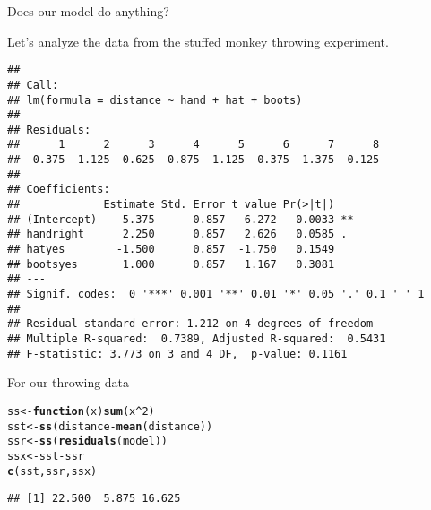 \documentclass[10pt]{beamer}\usepackage[]{graphicx}\usepackage[]{color}
\makeatletter
\newcommand{\hlnum}[1]{\textcolor[rgb]{0.686,0.059,0.569}{#1}}%
\newcommand{\hlopt}[1]{\textcolor[rgb]{0,0,0}{#1}}%
\newcommand{\hlstd}[1]{\textcolor[rgb]{0.345,0.345,0.345}{#1}}%
\newcommand{\hlkwa}[1]{\textcolor[rgb]{0.161,0.373,0.58}{\textbf{#1}}}%
\newcommand{\hlkwb}[1]{\textcolor[rgb]{0.69,0.353,0.396}{#1}}%
\newcommand{\hlkwc}[1]{\textcolor[rgb]{0.333,0.667,0.333}{#1}}%
\newcommand{\hlkwd}[1]{\textcolor[rgb]{0.737,0.353,0.396}{\textbf{#1}}}%
\newenvironment{kframe}{%
 \def\at@end@of@kframe{}%
 \ifinner\ifhmode%
  \def\at@end@of@kframe{\end{minipage}}%
  \begin{minipage}{\columnwidth}%
 \fi\fi%
 \def\FrameCommand##1{\hskip\@totalleftmargin \hskip-\fboxsep
 \colorbox{shadecolor}{##1}\hskip-\fboxsep
     \hskip-\linewidth \hskip-\@totalleftmargin \hskip\columnwidth}%
 \MakeFramed {\advance\hsize-\width
   \@totalleftmargin\z@ \linewidth\hsize
   \@setminipage}}%
 {\par\unskip\endMakeFramed%
 \at@end@of@kframe}
\newenvironment{knitrout}{}{} %
\makeatother
\begin{document}
\begin{frame}[fragile]{Does our model do anything?}

Let's analyze the data from the stuffed monkey throwing experiment.
\footnotesize
\begin{knitrout}
\color{fgcolor}\begin{kframe}
\begin{verbatim}
## 
## Call:
## lm(formula = distance ~ hand + hat + boots)
## 
## Residuals:
##      1      2      3      4      5      6      7      8 
## -0.375 -1.125  0.625  0.875  1.125  0.375 -1.375 -0.125 
## 
## Coefficients:
##             Estimate Std. Error t value Pr(>|t|)   
## (Intercept)    5.375      0.857   6.272   0.0033 **
## handright      2.250      0.857   2.626   0.0585 . 
## hatyes        -1.500      0.857  -1.750   0.1549   
## bootsyes       1.000      0.857   1.167   0.3081   
## ---
## Signif. codes:  0 '***' 0.001 '**' 0.01 '*' 0.05 '.' 0.1 ' ' 1
## 
## Residual standard error: 1.212 on 4 degrees of freedom
## Multiple R-squared:  0.7389,	Adjusted R-squared:  0.5431 
## F-statistic: 3.773 on 3 and 4 DF,  p-value: 0.1161
\end{verbatim}
\end{kframe}
\end{knitrout}

\end{frame}

\begin{frame}[fragile]{For our throwing data}

\begin{knitrout}
\color{fgcolor}\begin{kframe}
\begin{alltt}
\hlstd{ss} \hlkwb{<-} \hlkwa{function}\hlstd{(}\hlkwc{x}\hlstd{)} \hlkwd{sum}\hlstd{(x}\hlopt{^}\hlnum{2}\hlstd{)}
\hlstd{sst} \hlkwb{<-} \hlkwd{ss}\hlstd{(distance} \hlopt{-} \hlkwd{mean}\hlstd{(distance))}
\hlstd{ssr} \hlkwb{<-} \hlkwd{ss}\hlstd{(}\hlkwd{residuals}\hlstd{(model))}
\hlstd{ssx} \hlkwb{<-} \hlstd{sst} \hlopt{-} \hlstd{ssr}
\hlkwd{c}\hlstd{(sst, ssr, ssx)}
\end{alltt}
\begin{verbatim}
## [1] 22.500  5.875 16.625
\end{verbatim}
\end{kframe}
\end{knitrout}

\end{frame}
\end{document}
